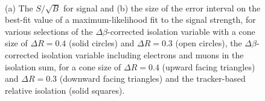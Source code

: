 \begin{figure}[h!]
\begin{center}
~\\
\end{center}
\caption[The $S/\sqrt{B}$ for \Ztautau signal and
the size of the error interval on the best-fit value of a
maximum-likelihood fit to the \Ztautau signal strength, for various 
isolation selections.]{(a) The $S/\sqrt{B}$ for \Ztautau signal and (b) the size of the error interval on 
the best-fit value of a maximum-likelihood fit to the \Ztautau signal strength,
for various selections of the $\Delta\beta$-corrected
isolation variable with a cone size of $\Delta R = 0.4$ (solid circles) and $\Delta R = 0.3$ (open circles),
the $\Delta\beta$-corrected isolation variable including electrons and muons in the isolation
sum, for a cone size of $\Delta R =0.4$ (upward facing triangles) and $\Delta R =0.3$ (downward facing triangles) and
the tracker-based relative isolation (solid squares).}
\label{fig:mssm_selection_mt_muons}
\end{figure}

